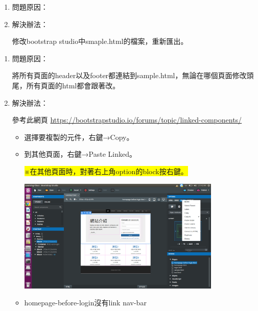 


\begin{enumerate}
\item 問題原因：


\item 解決辦法：

修改bootstrap studio中smaple.html的檔案，重新匯出。
	
\end{enumerate}




\begin{enumerate}
	\item 問題原因：
	
	將所有頁面的header以及footer都連結到sample.html，無論在哪個頁面修改頭尾，所有頁面的html都會跟著改。	
	
	\item 解決辦法：
	
	參考此網頁
	\url{https://bootstrapstudio.io/forums/topic/linked-components/}
	\begin{itemize}
		\item 選擇要複製的元件，右鍵→Copy。
			
		\item 到其他頁面，右鍵→Paste Linked。
		
		\colorbox{yellow}{※在其他頁面時，對著右上角option的block按右鍵。}
			
		\includegraphics[width=0.8\textwidth]{fig/fig01}
		\item homepage-before-login沒有link nav-bar
	\end{itemize}
\end{enumerate}






